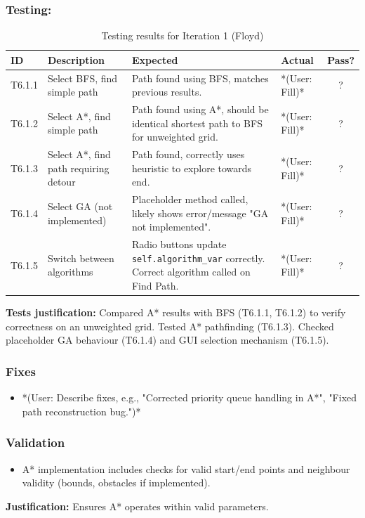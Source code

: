 \subsubsection{Testing:}
\begin{table}[htbp]
	\centering
	\begin{tabularx}{\textwidth}{|l|X|p{4.5cm}|p{1.5cm}|c|}
		\hline
		\textbf{ID} & \textbf{Description} & \textbf{Expected} & \textbf{Actual} & \textbf{Pass?} \\
		\hline
		T6.1.1 & Select BFS, find simple path & Path found using BFS, matches previous results. & *(User: Fill)* & ? \\
		\hline
		T6.1.2 & Select A*, find simple path & Path found using A*, should be identical shortest path to BFS for unweighted grid. & *(User: Fill)* & ? \\
		\hline
		T6.1.3 & Select A*, find path requiring detour & Path found, correctly uses heuristic to explore towards end. & *(User: Fill)* & ? \\
		\hline
		T6.1.4 & Select GA (not implemented) & Placeholder method called, likely shows error/message "GA not implemented". & *(User: Fill)* & ? \\
		\hline
		T6.1.5 & Switch between algorithms & Radio buttons update \verb|self.algorithm_var| correctly. Correct algorithm called on Find Path. & *(User: Fill)* & ? \\
		\hline
	\end{tabularx}
	\caption{Testing results for Iteration 1 (Floyd)}
\end{table}
\textbf{Tests justification:} Compared A* results with BFS (T6.1.1, T6.1.2) to verify correctness on an unweighted grid. Tested A* pathfinding (T6.1.3). Checked placeholder GA behaviour (T6.1.4) and GUI selection mechanism (T6.1.5).

\subsubsection{Fixes}
\begin{itemize}
	\item *(User: Describe fixes, e.g., "Corrected priority queue handling in A*", "Fixed path reconstruction bug.")*
\end{itemize}

\subsubsection{Validation}
\begin{itemize}
	\item A* implementation includes checks for valid start/end points and neighbour validity (bounds, obstacles if implemented).
\end{itemize}
\textbf{Justification:} Ensures A* operates within valid parameters.


